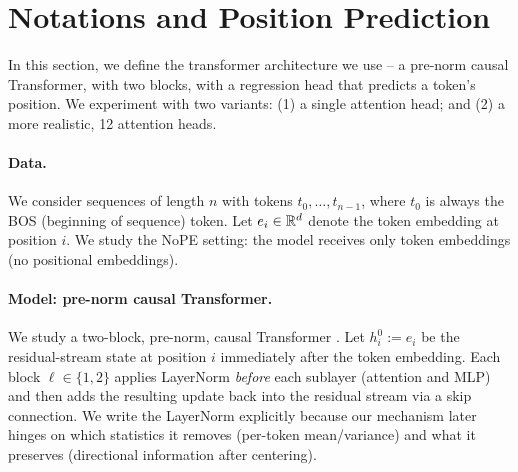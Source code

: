 \documentclass{article}
\theoremstyle{plain}
\theoremstyle{definition}
\theoremstyle{remark}
\begin{document}


\section{Notations and Position Prediction}
\label{sec:notation}

In this section, we define the transformer architecture we use -- a pre-norm causal Transformer, with two blocks, with a regression head that predicts a token's position. We experiment with two variants: (1) a single attention head; and (2) a more realistic, 12 attention heads.

\paragraph{Data.}
We consider sequences of length $n$ with tokens $t_0,\dots,t_{n-1}$, where $t_0$ is always the BOS (beginning of sequence) token.
Let $e_i \in \mathbb{R}^d$ denote the token embedding at position $i$.
We study the NoPE setting: the model receives only token embeddings (no positional embeddings).

\paragraph{Model: pre-norm causal Transformer.}
We study a two-block, pre-norm, causal Transformer \citep{@@}.
Let $h_i^{0} := e_i$ be the residual-stream state at position $i$ immediately after the token embedding.
Each block $\ell\in\{1,2\}$ applies LayerNorm \emph{before} each sublayer (attention and MLP) and then adds the resulting update back
into the residual stream via a skip connection. We write the LayerNorm explicitly because our mechanism later hinges on which statistics
it removes (per-token mean/variance) and what it preserves (directional information after centering).
\end{document}
